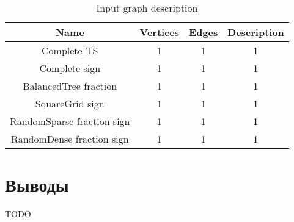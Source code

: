 \begin{table}
\centering

\begin{tabular}{c|c|c|c}  
Name & Vertices & Edges & Description\\
\hline\hline
Complete TS & 1 & 1 & 1 \\  
Complete sign & 1 & 1 & 1 \\  
BalancedTree fraction & 1 & 1 & 1 \\  
SquareGrid sign & 1 & 1 & 1 \\  
RandomSparse fraction sign & 1 & 1 & 1 \\  
RandomDense fraction sign & 1 & 1 & 1 \\  

\hline
\end{tabular}

\caption{Input graph description}
\label{bf_algo_comparison}
\end{table}



\FloatBarrier
\section{Выводы}

TODO

\FloatBarrier
